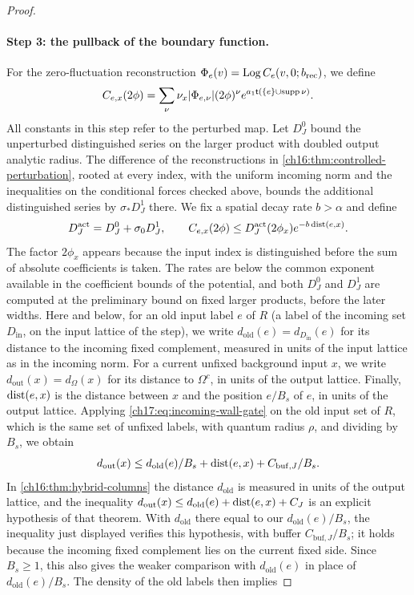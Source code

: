 \begin{proof}
\paragraph{Step 3: the pullback of the boundary function.}
For the zero-fluctuation reconstruction $\Phi_e(v)=\operatorname{Log} C_e(v,0;b_{\mathrm{rec}})$, we define
\[
 C_{e,x}(2\phi)=\sum_\nu\nu_x\lvert \Phi_{e,\nu}\rvert(2\phi)^\nu e^{a_1\mathsf t(\{e\}\cup\operatorname{supp}\nu)}.
\]
All constants in this step refer to the perturbed map. Let $D_J^0$ bound the unperturbed distinguished series on the larger product with doubled output analytic radius. The difference of the reconstructions in \cref{ch16:thm:controlled-perturbation}, rooted at every index, with the uniform incoming norm and the inequalities on the conditional forces checked above, bounds the additional distinguished series by $\sigma_*D_J^1$ there. We fix a spatial decay rate $b>\alpha$ and define
\begin{equation}\label{ch17:eq:actual-column-ceiling}
 D_J^{\mathrm{act}}=D_J^0+\sigma_0D_J^1,\qquad C_{e,x}(2\phi)\le D_J^{\mathrm{act}}(2\phi_x)e^{-b\operatorname{dist}(e,x)}.
\end{equation}
The factor $2\phi_x$ appears because the input index is distinguished before the sum of absolute coefficients is taken. The rates are below the common exponent available in the coefficient bounds of the potential, and both $D_J^0$ and $D_J^1$ are computed at the preliminary bound on fixed larger products, before the later widths. Here and below, for an old input label $e$ of $R$ (a label of the incoming set $D_{\mathrm{in}}$, on the input lattice of the step), we write $d_{\mathrm{old}}(e)=d_{D_{\mathrm{in}}}(e)$ for its distance to the incoming fixed complement, measured in units of the input lattice as in the incoming norm. For a current unfixed background input $x$, we write $d_{\mathrm{out}}(x)=d_\Omega(x)$ for its distance to $\Omega^c$, in units of the output lattice. Finally, $\operatorname{dist}(e,x)$ is the distance between $x$ and the position $e/B_s$ of $e$, in units of the output lattice. Applying \eqref{ch17:eq:incoming-wall-gate} on the old input set of $R$, which is the same set of unfixed labels, with quantum radius $\rho$, and dividing by $B_s$, we obtain
\[
 d_{\mathrm{out}}(x)\le d_{\mathrm{old}}(e)/B_s+\operatorname{dist}(e,x)+C_{\mathrm{buf},J}/B_s.
\]
In \cref{ch16:thm:hybrid-columns} the distance $d_{\mathrm{old}}$ is measured in units of the output lattice, and the inequality $d_{\mathrm{out}}(x)\le d_{\mathrm{old}}(e)+\operatorname{dist}(e,x)+C_J$ is an explicit hypothesis of that theorem. With $d_{\mathrm{old}}$ there equal to our $d_{\mathrm{old}}(e)/B_s$, the inequality just displayed verifies this hypothesis, with buffer $C_{\mathrm{buf},J}/B_s$; it holds because the incoming fixed complement lies on the current fixed side. Since $B_s\ge1$, this also gives the weaker comparison with $d_{\mathrm{old}}(e)$ in place of $d_{\mathrm{old}}(e)/B_s$. The density of the old labels then implies

\end{proof}

